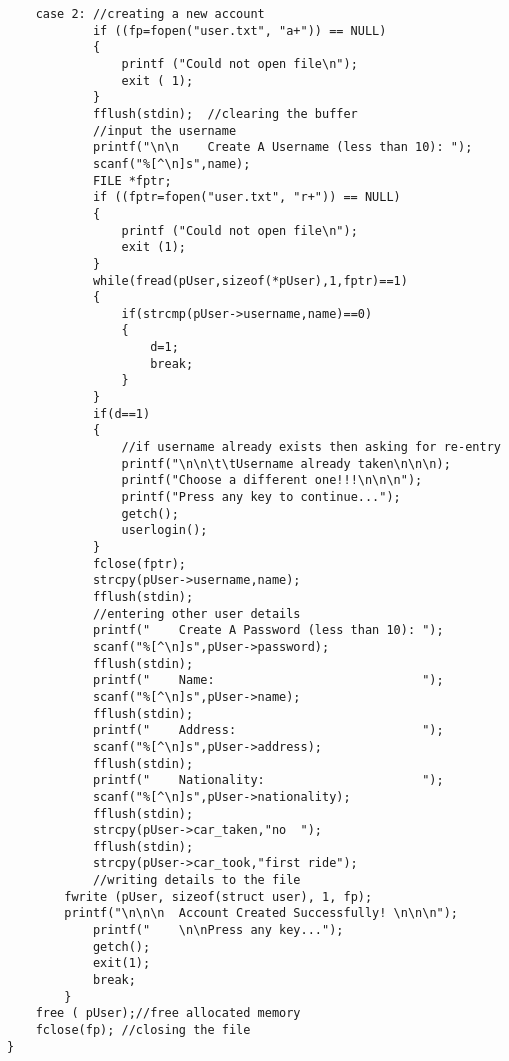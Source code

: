 \documentclass[12pt]{article}
\begin{document}
\begin{lstlisting}
    case 2: //creating a new account 
      	    if ((fp=fopen("user.txt", "a+")) == NULL)
            {
                printf ("Could not open file\n");
                exit ( 1);
            }
            fflush(stdin);  //clearing the buffer
            //input the username
            printf("\n\n	Create A Username (less than 10): ");
            scanf("%[^\n]s",name);
            FILE *fptr;
            if ((fptr=fopen("user.txt", "r+")) == NULL)
            {
                printf ("Could not open file\n");
                exit (1);
            }
            while(fread(pUser,sizeof(*pUser),1,fptr)==1)
            {
                if(strcmp(pUser->username,name)==0)
                {
                    d=1;
                    break;
                }
            }
            if(d==1)
            {
                //if username already exists then asking for re-entry
                printf("\n\n\t\tUsername already taken\n\n\n); 		
                printf("Choose a different one!!!\n\n\n");
                printf("Press any key to continue...");
                getch();
                userlogin();
            }
            fclose(fptr);
            strcpy(pUser->username,name);
            fflush(stdin);
            //entering other user details
            printf("	Create A Password (less than 10): ");
            scanf("%[^\n]s",pUser->password);
            fflush(stdin);
            printf("	Name:                             ");
            scanf("%[^\n]s",pUser->name);
            fflush(stdin);
            printf("	Address:                          ");
            scanf("%[^\n]s",pUser->address);
            fflush(stdin);
            printf("	Nationality:                      ");
            scanf("%[^\n]s",pUser->nationality);
            fflush(stdin);
            strcpy(pUser->car_taken,"no  ");
            fflush(stdin);
            strcpy(pUser->car_took,"first ride");
            //writing details to the file
	    fwrite (pUser, sizeof(struct user), 1, fp);
	    printf("\n\n\n	Account Created Successfully! \n\n\n");
            printf("	\n\nPress any key...");
            getch();
            exit(1);
            break;
    	}
    free ( pUser);//free allocated memory
    fclose(fp); //closing the file
}


\end{lstlisting}
\end{document}
